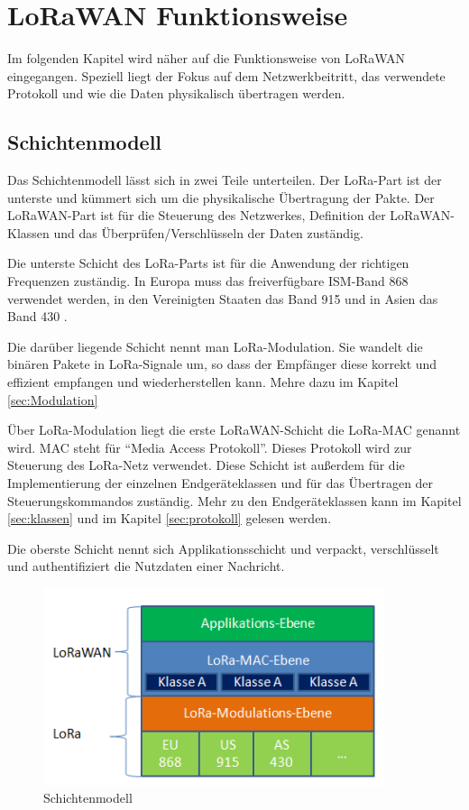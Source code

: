 \documentclass[a4paper, 12pt]{article}
\begin{document}
    \section{LoRaWAN Funktionsweise}
        Im folgenden Kapitel wird näher auf die Funktionsweise von LoRaWAN eingegangen. Speziell liegt der Fokus auf
        dem Netzwerkbeitritt, das verwendete Protokoll und wie die Daten physikalisch übertragen werden.
        \subsection{Schichtenmodell}
            Das Schichtenmodell lässt sich in zwei Teile unterteilen. Der LoRa-Part ist der unterste und kümmert sich 
            um die physikalische Übertragung der Pakte. Der LoRaWAN-Part ist für die Steuerung des 
            Netzwerkes, Definition der LoRaWAN-Klassen und das Überprüfen/Verschlüsseln der Daten zuständig.

            Die unterste Schicht des LoRa-Parts ist für die Anwendung der richtigen Frequenzen zuständig. In Europa 
            muss das freiverfügbare ISM-Band 868 verwendet werden, in den Vereinigten Staaten das Band 915 und 
            in Asien das Band 430 .\cite[S.7]{WhatIsLoRa}

            Die darüber liegende Schicht nennt man LoRa-Modulation. Sie wandelt die binären Pakete in 
            LoRa-Signale um, so dass der Empfänger diese korrekt und effizient empfangen und wiederherstellen 
            kann. Mehre dazu im Kapitel  \ref{sec:Modulation} 

            Über LoRa-Modulation liegt die erste LoRaWAN-Schicht die LoRa-MAC genannt wird. MAC steht für ``Media Access 
            Protokoll''. Dieses Protokoll wird zur Steuerung des LoRa-Netz verwendet. Diese Schicht ist außerdem für 
            die Implementierung der einzelnen Endgeräteklassen 
            und für das Übertragen der Steuerungskommandos zuständig. Mehr zu den Endgeräteklassen kann im Kapitel 
            \ref{sec:klassen}  und im Kapitel \ref{sec:protokoll}  gelesen werden.

            Die oberste Schicht nennt sich Applikationsschicht und verpackt, verschlüsselt und authentifiziert 
            die Nutzdaten einer Nachricht.

            \begin{figure}[ht]
                \centering
                \includegraphics[width=10cm]{LoRaLayer}
                \caption{Schichtenmodell}
            \end{figure}
 
\end{document}
